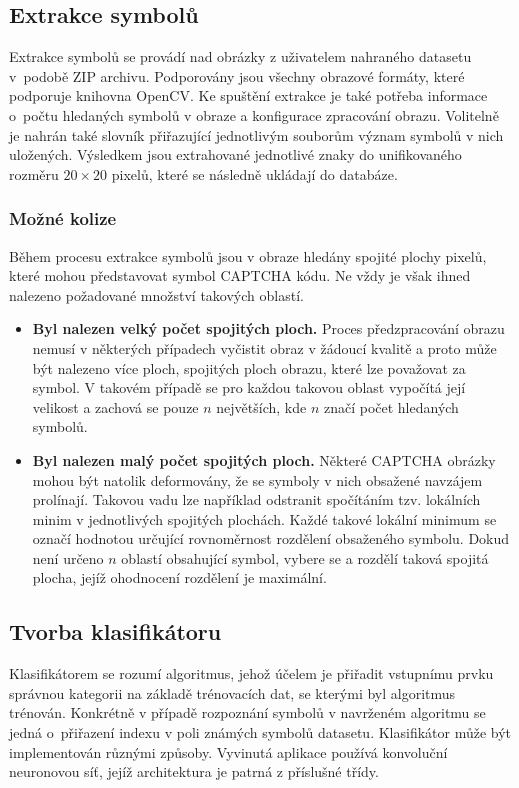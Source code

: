 \documentclass[
  field=ainfp,
  master=true,
  biblatex,
  sourcecodes=false,
  theorems=false,
  glossaries,
  index
]{kidiplom}
\begin{document}
\subsection{Extrakce symbolů}
Extrakce symbolů se provádí nad obrázky z uživatelem nahraného datasetu v~podobě ZIP archivu. Podporovány jsou všechny obrazové formáty, které podporuje knihovna OpenCV. Ke spuštění extrakce je také potřeba informace o~počtu hledaných symbolů v obraze a konfigurace zpracování obrazu. Volitelně je na\-hrán také slovník přiřazující jednotlivým souborům význam symbolů v nich uložených. Výsledkem jsou extrahované jednotlivé znaky do unifikovaného rozměru  $20\times20$ pixelů, které se následně ukládají do databáze.

\subsubsection*{Možné kolize}
Během procesu extrakce symbolů jsou v obraze hledány spojité plochy pixelů, které mohou představovat symbol CAPTCHA kódu. Ne vždy je však ihned nalezeno požadované množství takových oblastí. 
\begin{itemize}
\item \textbf{Byl nalezen velký počet spojitých ploch.} Proces předzpracování ob\-razu nemusí v některých případech vyčistit obraz v žádoucí kvalitě a proto může být nalezeno více ploch, spojitých ploch obrazu, které lze považovat za symbol. V takovém případě se pro každou takovou oblast vypočítá její velikost a zachová se pouze $n$ největších, kde $n$ značí počet hledaných symbolů.

\item \textbf{Byl nalezen malý počet spojitých ploch.} Některé CAPTCHA obrázky mohou být natolik deformovány, že se symboly v nich obsažené navzájem prolínají. Takovou vadu lze například odstranit spočítáním tzv. lokálních minim v jednotlivých spojitých plochách. Každé takové lokální minimum se označí hodnotou určující rovnoměrnost rozdělení obsaženého symbolu. Dokud není určeno $n$ oblastí obsahující symbol, vybere se a rozdělí taková spojitá plocha, jejíž ohodnocení rozdělení je maximální.
\end{itemize}


\subsection{Tvorba klasifikátoru}
Klasifikátorem se rozumí algoritmus, jehož účelem je přiřadit vstupnímu prvku správnou kategorii na základě trénovacích dat, se kterými byl algoritmus trénován. Konkrétně v případě rozpoznání symbolů v navrženém algoritmu se jedná o~při\-řazení indexu v poli známých symbolů datasetu. Klasifikátor může být implementován různými způsoby. Vyvinutá aplikace používá konvoluční neuronovou síť, jejíž architektura je patrná z příslušné třídy. 
\end{document}

